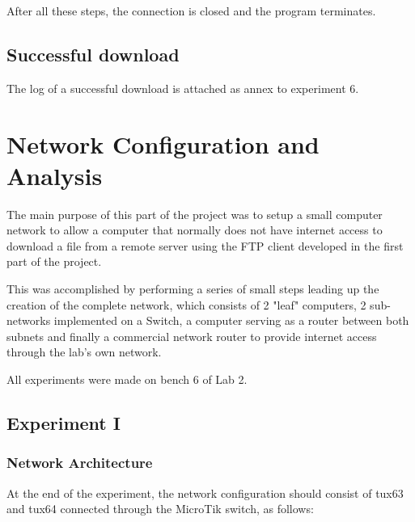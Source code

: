 \documentclass[11pt,a4paper,twocolumn]{article}
\begin{document}
After all these steps, the connection is closed and the program terminates.

\subsection{Successful download}

The log of a successful download is attached as annex to experiment 6.

\section{Network Configuration and Analysis}

The main purpose of this part of the project was to setup a small computer network to allow a computer that normally does not have internet access to download a file from a remote server using the FTP client developed in the first part of the project.

This was accomplished by performing a series of small steps leading up the creation of the complete network, which consists of 2 "leaf" computers, 2 sub-networks implemented on a Switch, a  computer serving as a router between both subnets and finally a commercial network router to provide internet access through the lab's own network.

All experiments were made on bench 6 of Lab 2.

\subsection{Experiment I}

\subsubsection{Network Architecture}

At the end of the experiment, the network configuration should consist of tux63 and tux64 connected through the MicroTik switch, as follows:
\end{document}

